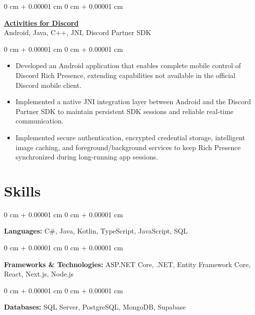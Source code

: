 \documentclass[10pt, letterpaper]{article}
\newenvironment{highlights}{
    \begin{itemize}[
        topsep=0.07 cm,
        parsep=0.045 cm,
        partopsep=0pt,
        itemsep=0pt,
        leftmargin=0 cm + 10pt
    ]
}{
    \end{itemize}
}
\newenvironment{onecolentry}{
    \begin{adjustwidth}{
        0 cm + 0.00001 cm
    }{
        0 cm + 0.00001 cm
    }
}{
    \end{adjustwidth}
}
\newcommand{\muted}[1]{{\color{mutedColor}#1}}
\newcommand{\entryTitle}[1]{\textbf{#1}}
\newcommand{\techStack}[1]{{\small\muted{#1}}}
\let\oldhref\href
\renewcommand{\href}[2]{\oldhref{#1}{\textbf{#2}}}
\begin{document}
\vspace{0.11 cm}

\begin{onecolentry}
    \entryTitle{\href{https://github.com/vinithreddybanda/activities}{Activities for Discord}}\\
    \techStack{Android, Java, C++, JNI, Discord Partner SDK}
\end{onecolentry}

\vspace{0.11 cm}
\begin{onecolentry}
    \begin{highlights}
        \item Developed an Android application that enables complete mobile control of Discord Rich Presence, extending capabilities not available in the official Discord mobile client.
        \item Implemented a native JNI integration layer between Android and the Discord Partner SDK to maintain persistent SDK sessions and reliable real-time communication.
        \item Implemented secure authentication, encrypted credential storage, intelligent image caching, and foreground/background services to keep Rich Presence synchronized during long-running app sessions.
    \end{highlights}
\end{onecolentry}

\section{Skills}

\begin{onecolentry}
\textbf{Languages:}
C\#, Java, Kotlin, TypeScript, JavaScript, SQL
\end{onecolentry}

\vspace{0.11cm}

\begin{onecolentry}
\textbf{Frameworks \& Technologies:}
ASP.NET Core, .NET, Entity Framework Core, React, Next.js, Node.js
\end{onecolentry}

\vspace{0.11cm}

\begin{onecolentry}
\textbf{Databases:}
SQL Server, PostgreSQL, MongoDB, Supabase
\end{onecolentry}
\end{document}
